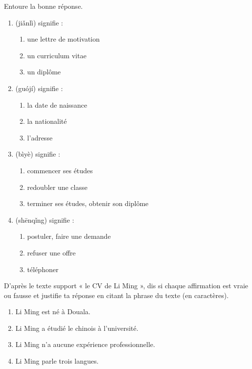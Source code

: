 \documentclass[11pt]{article}
\newcommand{\zh}[1]{\ifmmode\text{#1}\else{#1}\fi}
\begin{document}
\begin{exercice}
Entoure la bonne réponse.
\begin{enumerate}
\item \zh{简历} (jiǎnlì) signifie :
\begin{enumerate}
\item une lettre de motivation \item un curriculum vitae \item un diplôme
\end{enumerate}
\item \zh{国籍} (guójí) signifie :
\begin{enumerate}
\item la date de naissance \item la nationalité \item l'adresse
\end{enumerate}
\item \zh{毕业} (bìyè) signifie :
\begin{enumerate}
\item commencer ses études \item redoubler une classe \item terminer ses études, obtenir son diplôme
\end{enumerate}
\item \zh{申请} (shēnqǐng) signifie :
\begin{enumerate}
\item postuler, faire une demande \item refuser une offre \item téléphoner
\end{enumerate}
\end{enumerate}
\end{exercice}

\begin{exercice}
D'après le texte support « le CV de Li Ming », dis si chaque affirmation est vraie ou fausse et justifie ta réponse en citant la phrase du texte (en caractères).
\begin{enumerate}
\item Li Ming est né à Douala.
\item Li Ming a étudié le chinois à l'université.
\item Li Ming n'a aucune expérience professionnelle.
\item Li Ming parle trois langues.
\end{enumerate}
\end{exercice}
\end{document}
